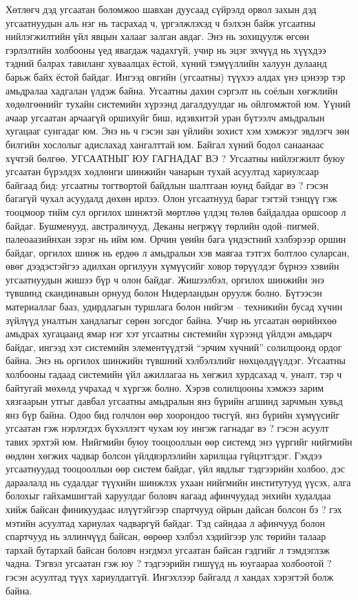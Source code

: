 Хөтлөгч дэд угсаатан боломжоо шавхан дуусаад сүйрэлд орвол захын дэд угсаатнуудын аль нэг нь тасрахад ч, үргэлжлэхэд ч бэлхэн байж угсаатны нийлэгжилтийн үйл явцын халааг залган авдаг. Энэ нь зохицуулж өгсөн гэрлэлтийн холбооны үед явагдаж чадахгүй, учир нь эцэг эхчүүд нь хүүхдээ тэдний балрах тавиланг хуваалцах ёстой, хүний тэмүүллийн халуун дулаанд барьж байх ёстой байдаг. Ингээд овгийн (угсаатны) түүхээ алдах үнэ цэнээр тэр амьдралаа хадгалан үлдэж байна.
Угсаатны дахин сэргэлт нь соёлын хөгжлийн хөдөлгөөнийг тухайн системийн хүрээнд дагалдуулдаг нь ойлгомжтой юм. Үүний ачаар угсаатан арчаагүй оршихуйг биш, идэвхитэй уран бүтээлч амьдралын хугацааг сунгадаг юм. Энэ нь ч гэсэн зан үйлийн зохист хэм хэмжээг эвдлэгч зөн билгийн хослолыг адислахад хангалттай юм. Байгал хүний бодол санаанаас хүчтэй бөлгөө.
УГСААТНЫГ ЮУ ГАГНАДАГ ВЭ ?
Угсаатны нийлэгжилт буюу угсаатан бүрэлдэх хөдлөнги шинжийн чанарын тухай асуултад хариулсаар байгаад бид: угсаатны тогтвортой байдлын шалтгаан юунд байдаг вэ ? гэсэн багагүй чухал асуудалд дөхөн ирлээ. Олон угсаатнууд бараг тэгтэй тэнцүү гэж тооцмоор тийм сул оргилох шинжтэй мөртлөө үлдэц төлөв байдалдаа оршсоор л байдаг. Бушменууд, австраличууд, Деканы негржүү төрлийн одой–пигмей, палеоаазийнхан зэрэг нь ийм юм. Орчин үеийн бага үндэстний хэлбэрээр оршин байдаг, оргилох шинж нь ердөө л амьдралын хэв маягаа тэтгэх болтлоо суларсан, өвөг дээдэстэйгээ адилхан оргилуун хүмүүсийг ховор төрүүлдэг бүрнээ хэвийн угсаатнуудын жишээ бүр ч олон байдаг. Жишээлбэл, оргилох шинжийн энэ түвшинд скандинавын орнууд болон Нидерландын оруулж болно.
Бүтээсэн материаллаг бааз, удирдлагын туршлага болон нийгэм – техникийн бусад хүчин зүйлүүд уналтын хандлагыг сөрөн зогсдог байна. Учир нь угсаатан өөрийнхөө амьдрах хугацаанд ямар нэг хэт угсаатны системийн хүрээнд үйлдэн амьдарч байдаг, ингээд хэт системийн элементүүдтэй “эрчим хүчний” солилцоонд ордог байна. Энэ нь оргилох шинжийн түвшний хэлбэлзлийг нөхцөлдүүлдэг. Угсаатны холбооны гадаад системийн үйл ажиллагаа нь хөгжил хурдсахад ч, уналт, тэр ч байтугай мөхөлд учрахад ч хүргэж болно. Хэрэв солилцооны хэмжээ зарим хязгаарын утгыг давбал угсаатны амьдралын янз бүрийн агшинд зарчмын хувьд янз бүр байна.
Одоо бид голчлон өөр хоорондоо төсгүй, янз бүрийн хүмүүсийг угсаатан гэж нэрлэгдэх бүхэллэгт чухам юу ингэж гагнадаг вэ ? гэсэн асуулт тавих эрхтэй юм. Нийгмийн буюу тооцооллын өөр системд энэ үүргийг нийгмийн өөдлөн хөгжих чадвар болсон үйлдвэрлэлийн харилцаа гүйцэтгэдэг. Гэхдээ угсаатнуудад тооцооллын өөр систем байдаг, үйл явдлыг тэдгээрийн холбоо, дэс дараалалд нь судалдаг түүхийн шинжлэх ухаан нийгмийн институтууд үүсэх, алга болохыг гайхамшигтай харуулдаг боловч яагаад афинчуудад энхийн худалдаа хийж байсан финикуудаас илүүтэйгээр спартчууд ойрын дайсан болсон бэ ? гэх мэтийн асуултад хариулах чадваргүй байдаг. Тэд сайндаа л афинчууд болон спартчууд нь эллинчүүд байсан, өөрөөр хэлбэл хэдийгээр улс төрийн талаар тархай бутархай байсан боловч нэгдмэл угсаатан байсан гэдгийг л тэмдэглэж чадна. Тэгвэл угсаатан гэж юу ? тэдгээрийн гишүүд нь юугаараа холбоотой ? гэсэн асуултад түүх хариулдаггүй. Ингэхлээр байгалд л хандах хэрэгтэй болж байна.
